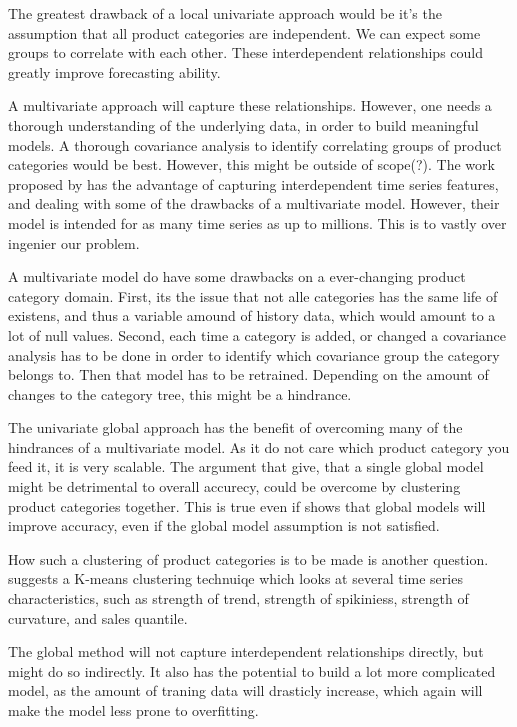 The greatest drawback of a local univariate approach would be it's the assumption that all product categories
are independent. We can expect some groups to correlate with each other. These interdependent relationships
could greatly improve forecasting ability.

A multivariate approach will capture these relationships.
However, one needs a thorough understanding of the underlying data, in order to build meaningful models.
A thorough covariance analysis to identify correlating groups of product categories would be best.
However, this might be outside of scope(?).
The work proposed by \cite{Sen2019} has the advantage of capturing interdependent time series features, and dealing with
some of the drawbacks of a multivariate model. However, their model is intended for as many time series as up to millions.
This is to vastly over ingenier our problem.

A multivariate model do have some drawbacks on a ever-changing product category domain.
First, its the issue that not alle categories has the same life of existens, and thus a variable
amound of history data, which would amount to a lot of null values.
Second, each time a category is added, or changed a covariance analysis has to be done in order to identify
which covariance group the category belongs to. Then that model has to be retrained.
Depending on the amount of changes to the category tree, this might be a hindrance.

The univariate global approach has the benefit of overcoming many of the hindrances of a multivariate model.
As it do not care which product category you feed it, it is very scalable. The argument that \cite{Bandara2017}
give, that a single global model might be detrimental to overall accurecy, could be overcome by clustering product categories together. This is true even if \cite{Rabanser2020}
shows that global models will improve accuracy, even if the global model assumption is not satisfied.

How such a clustering of product categories is to be made is another question.
\cite{Bandara2017} suggests a K-means clustering technuiqe
which looks at several time series characteristics, such as 
strength of trend, strength of spikiniess, strength of curvature,
and sales quantile.

The global method will not capture interdependent relationships directly,
but might do so indirectly. It also has the potential to build a lot more complicated model,
as the amount of traning data will drasticly increase, which again will make the model less prone to 
overfitting.

